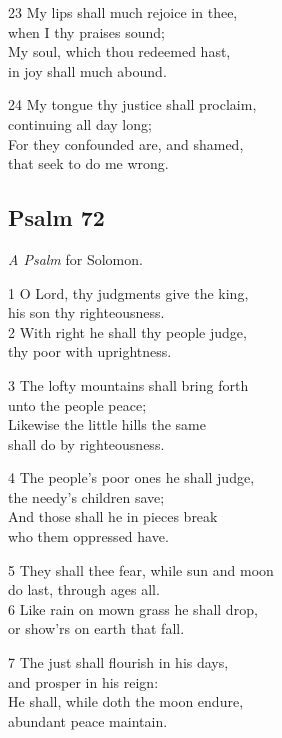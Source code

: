 23 My lips shall much rejoice in thee,\\
when I thy praises sound;\\
My soul, which thou redeemed hast,\\
in joy shall much abound.

24 My tongue thy justice shall proclaim,\\
continuing all day long;\\
For they confounded are, and shamed,\\
that seek to do me wrong.


\begin{center}
\quad{}\quad{}
\end{center}

\subsection*{Psalm 72}


\emph{A Psalm} for Solomon.

1 O Lord, thy judgments give the king,\\
his son thy righteousness.\\
2 With right he shall thy people judge,\\
thy poor with uprightness.

3 The lofty mountains shall bring forth\\
unto the people peace;\\
Likewise the little hills the same\\
shall do by righteousness.

4 The people’s poor ones he shall judge,\\
the needy’s children save;\\
And those shall he in pieces break\\
who them oppressed have.

5 They shall thee fear, while sun and moon\\
do last, through ages all.\\
6 Like rain on mown grass he shall drop,\\
or show’rs on earth that fall.

7 The just shall flourish in his days,\\
and prosper in his reign:\\
He shall, while doth the moon endure,\\
abundant peace maintain.

